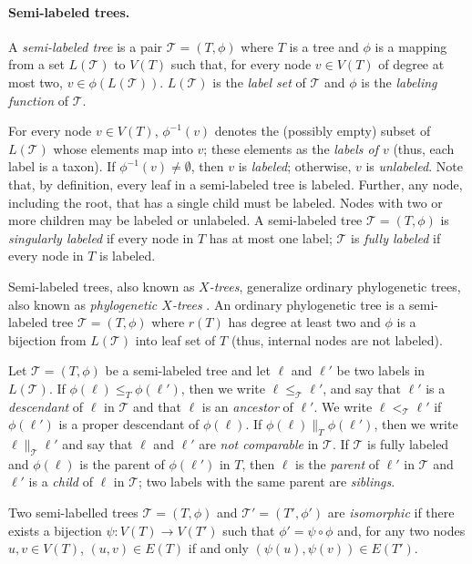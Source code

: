 \documentclass[11pt]{article}
\newcommand{\T}{\ensuremath{\mathcal{T}}}
\theoremstyle{definition}
\begin{document}
\paragraph{Semi-labeled trees.} A \emph{semi-labeled tree} is a pair $\T = (T,\phi)$ where $T$ is a tree and $\phi$ is a mapping from a set $L(\T)$ to $V(T)$ such that, for every node $v \in V(T)$ of degree at most two, $v \in \phi(L(\T))$.  $L(\T)$ is the \emph{label set} of $\T$ and $\phi$ is the \emph{labeling function} of $\T$.  

For every node $v \in V(T)$, $\phi^{-1}(v)$ denotes the (possibly empty) subset of $L(\T)$ whose elements map into $v$; these elements as the \emph{labels of $v$} (thus, each label is a taxon). If $\phi^{-1}(v) \neq \emptyset$, then $v$ is \emph{labeled}; otherwise, $v$ is \emph{unlabeled}.  
Note that, by definition, every leaf in a semi-labeled tree is labeled.  Further, any node, including the root, that has a single child must be labeled.  Nodes with two or more children may be labeled or unlabeled.  A semi-labeled tree $\T = (T,\phi)$ is \emph{singularly labeled} if every node in $T$ has
at most one label; $\T$ is \emph{fully labeled} if every node in $T$ is labeled.

Semi-labeled trees, also known as \emph{$X$-trees}, generalize ordinary phylogenetic trees, also known as \emph{phylogenetic $X$-trees} \cite{SempleSteel03}.  An ordinary phylogenetic tree is a semi-labeled tree $\T = (T,\phi)$ where $r(T)$ has degree at least two and $\phi$ is a bijection from $L(\T)$ into leaf set of $T$ (thus, internal nodes are not labeled). 

Let $\T = (T,\phi)$ be a semi-labeled tree and let $\ell$ and $\ell'$ be two labels in $L(\T)$.  
If $\phi(\ell) \le_T \phi(\ell')$, then we write $\ell \le_\T \ell'$, and say that $\ell'$ is a \emph{descendant} of $\ell$ in $\T$ and that $\ell$ is an \emph{ancestor} of $\ell'$.  We write $\ell <_\T \ell'$ if $\phi(\ell')$ is a proper descendant of $\phi(\ell)$.   If $\phi(\ell) \parallel_T \phi(\ell')$, then we write $\ell \parallel_\T \ell'$ and say that $\ell$ and $\ell'$ are \emph{not comparable} in $\T$.  If $\T$ is fully labeled and
$\phi(\ell)$ is the parent of $\phi(\ell')$ in $T$, then $\ell$ is the \emph{parent} of $\ell'$ in $\T$ and $\ell'$ is a \emph{child} of $\ell$ in $\T$; two labels with the same parent are \emph{siblings}.

Two semi-labelled trees $\T = (T,\phi)$ and $\T' = (T', \phi')$ are \emph{isomorphic} if there exists a bijection $\psi : V(T) \rightarrow V(T')$ such that $\phi' = \psi \circ \phi$ and, for any two nodes $u, v \in V(T)$, $(u,v) \in E(T)$ if and only $(\psi(u), \psi(v)) \in E(T')$.
\end{document}
